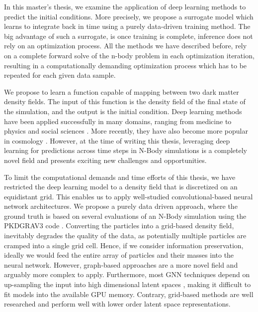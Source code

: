 \documentclass{article}
\begin{document}
In this master’s thesis, we examine the application of deep learning methods to predict the initial conditions. More precisely, we propose a surrogate model which learns to integrate back in time using a purely data-driven training method. The big advantage of such a surrogate, is once training is complete, inference does not rely on an optimization process. All the methods we have described before, rely on a complete forward solve of the n-body problem in each optimization iteration, resulting in a computationally demanding optimization process which has to be repeated for each given data sample.

We propose to learn a function capable of mapping between two dark matter density fields. The input of this function is the density field of the final state of the simulation, and the output is the initial condition. Deep learning methods have been applied successfully in many domains, ranging from medicine \citep{wang2019deep} to physics \citep{thuerey2021physics} and social sciences \citep{orabi2018deep}. More recently, they have also become more popular in cosmology \citep{escamilla2020deep, mathuriya2018cosmoflow, bernardini2022ember}. However, at the time of writing this thesis, leveraging deep learning for predictions across time steps in N-Body simulations is a completely novel field and presents exciting new challenges and opportunities.

To limit the computational demands and time efforts of this thesis, we have restricted the deep learning model to a density field that is discretized on an equidistant grid. This enables us to apply well-studied convolutional-based neural network architectures. We propose a purely data driven approach, where the ground truth is based on several evaluations of an N-Body simulation using the PKDGRAV3 code \citep{potter2017pkdgrav3}. Converting the particles into a grid-based density field, inevitably degrades the quality of the data, as potentially multiple particles are cramped into a single grid cell. Hence, if we consider information preservation, ideally we would feed the entire array of particles and their masses into the neural network. However, graph-based approaches are a more novel field and arguably more complex to apply. Furthermore, most GNN techniques depend on up-sampling the input into high dimensional latent spaces \citep{wu2020comprehensive}, making it difficult to fit models into the available GPU memory. Contrary, grid-based methods are well researched and perform well with lower order latent space representations.
\end{document}
